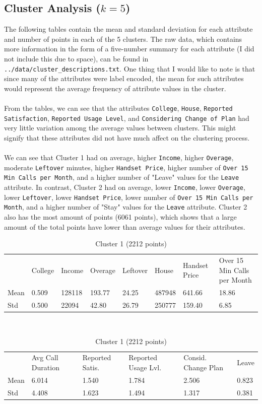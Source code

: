 \documentclass[12pt, notitlepage]{article}
\begin{document}
\subsection{Cluster Analysis ($k=5$)}
The following tables contain the mean and standard deviation for each attribute and number of points in each of the 5 clusters. The raw data, which contains more information in the form of a five-number summary for each attribute (I did not include this due to space), can be found in \texttt{../data/cluster\_descriptions.txt}. One thing that I would like to note is that since many of the attributes were label encoded, the mean for such attributes would represent the average frequency of attribute values in the cluster. \\\\
From the tables, we can see that the attributes \texttt{College}, \texttt{House}, \texttt{Reported Satisfaction}, \texttt{Reported Usage Level}, and \texttt{Considering Change of Plan} had very little variation among the average values between clusters. This might signify that these attributes did not have much affect on the clustering process. \\\\
We can see that Cluster 1 had on average, higher \texttt{Income}, higher \texttt{Overage}, moderate \texttt{Leftover} minutes, higher \texttt{Handset Price}, higher number of \texttt{Over 15 Min Calls per Month}, and a higher number of "Leave" values for the \texttt{Leave} attribute. In contrast, Cluster 2 had on average, lower \texttt{Income}, lower \texttt{Overage}, lower \texttt{Leftover}, lower \texttt{Handset Price}, lower number of \texttt{Over 15 Min Calls per Month}, and a higher number of "Stay" values for the \texttt{Leave} attribute. Cluster 2 also has the most amount of points (6061 points), which shows that a large amount of the total points have lower than average values for their attributes.
\begin{table}[H]
	\centering
	\caption{Cluster 1 (2212 points)}
	\begin{tabular}{|l|l|l|l|l|l|l|l|}
		\cline{1-8}
		& College & Income & Overage & Leftover & House   & Handset Price & Over 15 Min Calls per Month \\
		\cline{1-8}
		Mean & 0.509 & 128118 &  193.77 & 24.25 &487948 &  641.66&  18.86\\
		\cline{1-8}
		Std  & 0.500&  22094 &   42.80  & 26.79 & 250777  & 159.40  &   6.85 \\
		\cline{1-8}
		\end{tabular}\\
		\begin{tabular}{|l|l|l|l|l|l|}
		\cline{1-6}
		& Avg Call Duration & Reported Satis. & Reported Usage Lvl. & Consid. Change Plan & Leave\\
		\cline{1-6}
		Mean & 6.014 & 1.540 & 1.784 & 2.506 & 0.823\\
		\cline{1-6}
		Std & 4.408 & 1.623 & 1.494 & 1.317 &  0.381\\
		\cline{1-6}
	\end{tabular}
\end{table}
\end{document}
